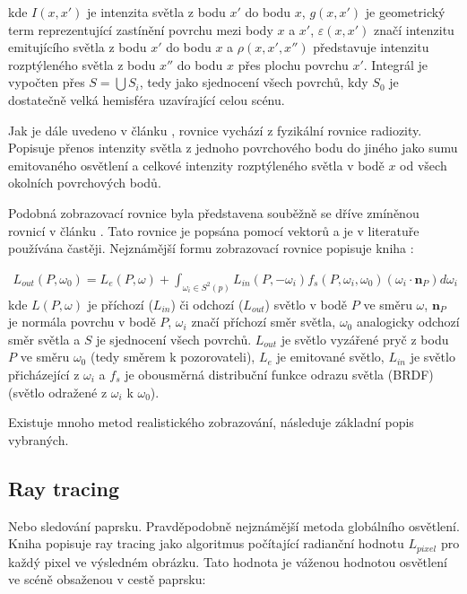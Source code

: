kde $I(x, x')$ je intenzita světla z bodu $x'$ do bodu $x$, $g(x, x')$ je geometrický term reprezentující zastínění povrchu mezi body $x$ a $x'$, $\varepsilon(x, x')$ značí intenzitu emitujícího světla z bodu $x'$ do bodu $x$ a $\rho(x, x', x'')$ představuje intenzitu rozptýleného světla z bodu $x''$ do bodu $x$ přes plochu povrchu $x'$. Integrál je vypočten přes $S = \bigcup S_i$, tedy jako sjednocení všech povrchů, kdy $S_0$ je dostatečně velká hemisféra uzavírající celou scénu.

Jak je dále uvedeno v článku \cite{render_eq}, rovnice vychází z fyzikální rovnice radiozity. Popisuje přenos intenzity světla z jednoho povrchového bodu do jiného jako sumu emitovaného osvětlení a celkové intenzity rozptýleného světla v bodě $x$ od všech okolních povrchových bodů.

Podobná zobrazovací rovnice byla představena souběžně se dříve zmíněnou rovnicí v článku \cite{render_eq_2}. Tato rovnice je popsána pomocí vektorů a je v literatuře používána častěji. Nejznámější formu zobrazovací rovnice popisuje kniha \cite{gfx_principles_practice}:

\begin{equation} \label{eq:render_2}
\begin{gathered}
L_{out}(P, \omega_0) = L_e(P, \omega) + \int_{\omega_i\in S^2(p)}L_{in}(P, -\omega_i)f_s(P, \omega_i, \omega_0)(\omega_i \cdot \textbf{n}_P)d\omega_i
\end{gathered}
\end{equation}
kde $L(P, \omega)$ je příchozí ($L_{in}$) či odchozí ($L_{out}$) světlo v bodě $P$ ve směru $\omega$, $\textbf{n}_P$ je normála povrchu v bodě $P$, $\omega_i$ značí příchozí směr světla, $\omega_0$ analogicky odchozí směr světla a $S$ je sjednocení všech povrchů. $L_{out}$ je světlo vyzářené pryč z bodu $P$ ve směru $\omega_0$ (tedy směrem k pozorovateli), $L_e$ je emitované světlo, $L_{in}$ je světlo přicházející z $\omega_i$ a $f_s$ je obousměrná distribuční funkce odrazu světla (BRDF)(světlo odražené z $\omega_i$ k $\omega_0$).

Existuje mnoho metod realistického zobrazování, následuje základní popis vybraných.

\subsection{Ray tracing}
Nebo sledování paprsku. Pravděpodobně nejznámější metoda globálního osvětlení. Kniha \cite{advanced_global} popisuje ray tracing jako algoritmus počítající radianční hodnotu $L_{pixel}$ pro každý pixel ve výsledném obrázku. Tato hodnota je váženou hodnotou osvětlení ve scéně obsaženou v cestě paprsku:

